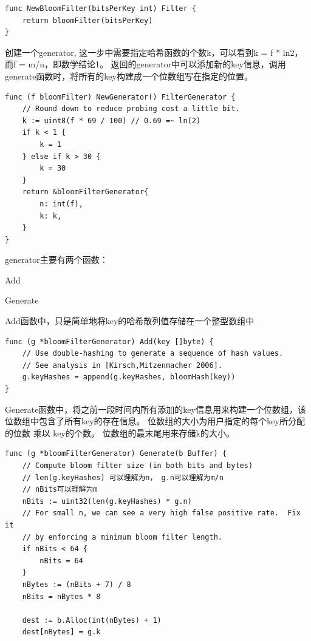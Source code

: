 \begin{enumerate}
\begin{lstlisting}[caption=NewBloomFilter , label=code_radds_storage_newbloomfilter]
func NewBloomFilter(bitsPerKey int) Filter {
	return bloomFilter(bitsPerKey)
}
\end{lstlisting}

创建一个generator, 这一步中需要指定哈希函数的个数k，可以看到k = f * ln2，而f = m/n，即数学结论1。
返回的generator中可以添加新的key信息，调用generate函数时，将所有的key构建成一个位数组写在指定的位置。

\begin{lstlisting}[caption=NewGenerator , label=code_radds_storage_NewGenerator]
func (f bloomFilter) NewGenerator() FilterGenerator {
	// Round down to reduce probing cost a little bit.
	k := uint8(f * 69 / 100) // 0.69 =~ ln(2)
	if k < 1 {
		k = 1
	} else if k > 30 {
		k = 30
	}
	return &bloomFilterGenerator{
		n: int(f),
		k: k,
	}
}
\end{lstlisting}

generator主要有两个函数：

Add

Generate

Add函数中，只是简单地将key的哈希散列值存储在一个整型数组中

\begin{lstlisting}[caption=Add , label=code_radds_storage_Add]
func (g *bloomFilterGenerator) Add(key []byte) {
	// Use double-hashing to generate a sequence of hash values.
	// See analysis in [Kirsch,Mitzenmacher 2006].
	g.keyHashes = append(g.keyHashes, bloomHash(key))
}
\end{lstlisting}


Generate函数中，将之前一段时间内所有添加的key信息用来构建一个位数组，该位数组中包含了所有key的存在信息。
位数组的大小为用户指定的每个key所分配的位数 乘以 key的个数。
位数组的最末尾用来存储k的大小。

\begin{lstlisting}[caption=Generate , label=code_radds_storage_Generate]
func (g *bloomFilterGenerator) Generate(b Buffer) {
	// Compute bloom filter size (in both bits and bytes)
	// len(g.keyHashes) 可以理解为n， g.n可以理解为m/n
	// nBits可以理解为m
	nBits := uint32(len(g.keyHashes) * g.n)
	// For small n, we can see a very high false positive rate.  Fix it
	// by enforcing a minimum bloom filter length.
	if nBits < 64 {
		nBits = 64
	}
	nBytes := (nBits + 7) / 8
	nBits = nBytes * 8

	dest := b.Alloc(int(nBytes) + 1)
	dest[nBytes] = g.k


\end{lstlisting}
\end{enumerate}
